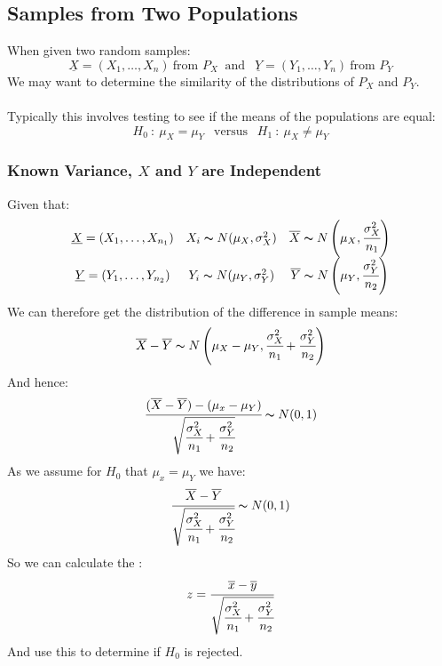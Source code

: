 \documentclass{report}
\begin{document}
        \subsection*{Samples from Two Populations}
            When given two random samples:
            \[\underline{X} = (X_1, \dots, X_n) \ \text{from }P_X \ \text{   and   } \ \ \underline{Y} = (Y_1, \dots, Y_n) \ \text{from } P_Y\]
            We may want to determine the similarity of the distributions of $P_X$ and $P_Y$.
            \\
            \\ Typically this involves testing to see if the means of the populations are equal:
            \[H_0 \ : \ \mu_X = \mu_Y \ \ \text{  versus  } \ \ H_1 \ : \ \mu_X \neq \mu_Y\]
            \subsubsection*{Known Variance, $X$ and $Y$ are Independent}
                Given that:
                \[\begin{matrix}
                    \underline{X} = (X_1, \dots, X_{n_1}) & X_i \thicksim N(\mu_X, \sigma^2_X) & \overline{X} \thicksim N\left(\mu_X, \cfrac{\sigma^2_X}{n_1}\right) \\
                    \underline{Y} = (Y_1, \dots, Y_{n_2}) & Y_i \thicksim N(\mu_Y, \sigma^2_Y) & \overline{Y} \thicksim N\left(\mu_Y, \cfrac{\sigma^2_Y}{n_2}\right) \\
                \end{matrix}\]
                We can therefore get the distribution of the difference in sample means:
                \[\overline{X} - \overline{Y} \thicksim N\left(\mu_X - \mu_Y, \cfrac{\sigma_X^2}{n_1} + \cfrac{\sigma_Y^2}{n_2}\right)\]
                And hence:
                \[\cfrac{(\overline{X} - \overline{Y}) - (\mu_x - \mu_Y)}{\sqrt{\cfrac{\sigma^2_X}{n_1} + \cfrac{\sigma^2_Y}{n_2}}} \thicksim N(0, 1)\]
                As we assume for $H_0$ that $\mu_x = \mu_Y$ we have:
                \[\cfrac{\overline{X} - \overline{Y}}{\sqrt{\cfrac{\sigma^2_X}{n_1} + \cfrac{\sigma^2_Y}{n_2}}} \thicksim N(0, 1)\]
                So we can calculate the :
                \[z = \cfrac{\overline{x} - \overline{y}}{\sqrt{\cfrac{\sigma^2_X}{n_1} + \cfrac{\sigma^2_Y}{n_2}}}\]
                And use this to determine if $H_0$ is rejected.
\end{document}
